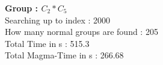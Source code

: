 \textbf{Group : $C_2*C_5$}\\
Searching up to index : 2000\\
How many normal groups are found : 205\\
Total Time in s : 515.3\\
Total Magma-Time in s : 266.68\\
